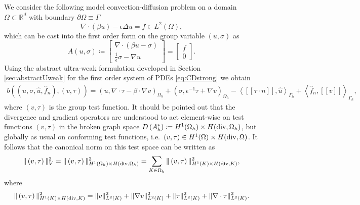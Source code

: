\documentclass[11pt,onecolumn]{scrartcl}
\newcommand{\eqnlab}[1]{\label{eq:#1}}
\newcommand{\eqnref}[1]{\eqref{eq:#1}}
\newcommand{\secref}[1]{\ref{sec:#1}}
\newcommand{\LRp}[1]{\left( #1 \right)}
\newcommand{\LRs}[1]{\left[ #1 \right]}
\newcommand{\LRa}[1]{\left\langle #1 \right\rangle}
\newcommand{\jump}[1] {\ensuremath{\LRs{\![#1]\!}}}
\renewcommand{\L}{L^2\LRp{\Omega}}
\newcommand{\pO}{\partial\Omega}
\newcommand{\Gh}{\Gamma_h}
\newcommand{\Oh}{\Omega_h}
\newcommand{\grad}{\nabla}
\renewcommand{\div}{\grad \cdot}
\begin{document}
We consider the following model convection-diffusion problem on a domain
$\Omega \subset \mathbb{R}^d$ with boundary $\pO \equiv \Gamma$
\begin{equation}
\div (\beta u) - \epsilon\Delta u = f  \in \L \label{primal},
\end{equation}
which can be cast into the first order form on the group variable
$\LRp{u,\sigma}$ as
\begin{equation}
\eqnlab{CDstrong}
A \LRp{u,\sigma} \coloneqq \LRs {
\begin{array}{c}
\div (\beta u - \sigma) \\ \frac{1}{\epsilon}\sigma - \grad u
\end{array}} = \LRs{
\begin{array}{c}
f \\ 0
\end{array}
}.
\end{equation}
Using the abstract ultra-weak formulation developed in Section
\secref{abstractUweak} for the first order system of PDEs \eqnref{CDstrong} we
obtain
\begin{align*}
b\left(\left(u,\sigma, \widehat{u}, \widehat{f}_n\right),
\left( v, \tau \right)\right) = \left(u,\div \tau - \beta \cdot \grad
v\right)_{\Oh} + \left(\sigma, \epsilon^{-1} \tau + \grad v\right)_{\Oh} - \LRa{
\jump{\tau\cdot n}, \widehat{u} }_{\Gh} + \LRa{ \widehat{f}_n,
  \jump{v} }_{\Gh},
\end{align*}
where $\LRp{v, \tau}$ is the group test function. It should be pointed
out that the divergence and gradient operators are understood to act
element-wise on test functions $\LRp{v, \tau}$ in the broken graph
space $ D\LRp{A_h^*} \coloneqq  H^1(\Oh) \times H({\rm div}, \Oh)$, but
globally as usual on conforming test functions, i.e.\ $ \LRp{v, \tau}
\in  H^1(\Omega) \times H({\rm div}, \Omega)$. It follows that the
canonical norm on this test space can be written as
\[
\|\left(v, \tau\right)\|_V^2 = \|\left(v, \tau\right)\|_{H^1(\Oh) \times H({\rm div},\Oh)}^2
= \sum_{K\in \Oh} \|\left(v, \tau\right)\|_{H^1(K) \times H({\rm
    div},K)}^2,
\]
where
\[
\|\left(v, \tau \right)\|_{H^1(K) \times H({\rm div},K)}^2 =
\|v\|_{L^2(K)}^2 + \|\grad v\|_{L^2(K)}^2 + \|\tau\|_{L^2(K)}^2 +
\|\div \tau\|_{L^2(K)}^2.
\]
\end{document}

